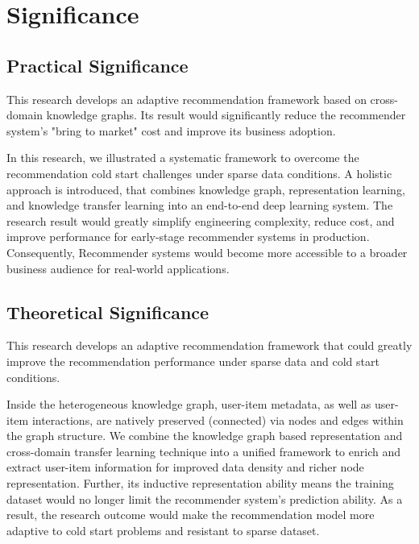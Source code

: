 \section{Significance}

\subsection{Practical Significance}
This research develops an adaptive recommendation framework based on cross-domain knowledge graphs. Its result would significantly reduce the recommender system's "bring to market" cost and improve its business adoption.

In this research, we illustrated a systematic framework to overcome the recommendation cold start challenges under sparse data conditions. 
A holistic approach is introduced, that combines knowledge graph, representation learning, and knowledge transfer learning into an end-to-end deep learning system. 
The research result would greatly simplify engineering complexity, reduce cost, and improve performance for early-stage recommender systems in production. Consequently, Recommender systems would become more accessible to a broader business audience for real-world applications.


\subsection{Theoretical Significance}
This research develops an adaptive recommendation framework that could greatly improve the recommendation performance under sparse data and cold start conditions.

Inside the heterogeneous knowledge graph, user-item metadata, as well as user-item interactions, are natively preserved (connected) via nodes and edges within the graph structure.  We combine the knowledge graph based representation and cross-domain transfer learning technique into a unified framework to enrich and extract user-item information for improved data density and richer node representation. Further, its inductive representation ability means the training dataset would no longer limit the recommender system's prediction ability. 
As a result, the research outcome would make the recommendation model more adaptive to cold start problems and resistant to sparse dataset.





